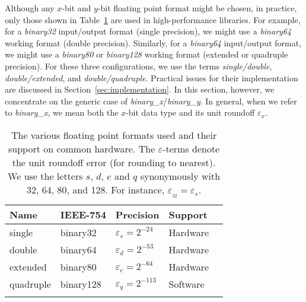 \documentclass[final]{siamltex}
\newcommand{\binaryx}{{\it binary\_\hspace*{1pt}x}}
\newcommand{\binaryy}{{\it binary\_\hspace*{0pt}y}}
\begin{document}
Although any $x$-bit and $y$-bit floating point format might be chosen, in
practice, only those shown in
Table~\ref{tab:precisions} are used in high-performance libraries. 
For example, for a {\it binary32} input/output format (single precision), we
might use a {\it binary64} working format (double precision). Similarly, for
a {\it binary64} input/output format, we might use a {\it binary80} or {\it binary128} working
format (extended or quadruple precision). For these three configurations, we use the terms
{\it single/double}, {\it double/extended}, and {\it
  double/quadruple}. Practical issues for their implementation are  
discussed in Section~\ref{sec:implementation}. In this section, however, we
concentrate on the generic case of \binaryx/\binaryy. In general, when we
refer to \binaryx, we mean both the $x$-bit data type and its unit roundoff $\varepsilon_x$. 
\begin{table}[htb]
  \begin{center}
\begin{tabular}[thb]{l@{\quad}l@{\quad}l@{\quad}l@{\quad}l@{\quad}}
\toprule
{\bf Name} & {\bf IEEE-754} & {\bf Precision} & {\bf Support}  \\
\midrule
single    & binary32   & $\varepsilon_s = 2^{-24}$ &  Hardware       \\ 
double    & binary64   & $\varepsilon_d = 2^{-53}$ &  Hardware       \\ 
extended  & binary80   & $\varepsilon_e = 2^{-64}$ &  Hardware       \\ 
quadruple & binary128  & $\varepsilon_q = 2^{-113}$ & Software       \\ 
\bottomrule\noalign{\smallskip}
\end{tabular}
  \end{center}
  \caption{The various floating point formats used and their support on common
    hardware. The $\varepsilon$-terms denote the unit roundoff error (for 
    rounding to nearest). We use the letters $s$, $d$, $e$ and
    $q$ synonymously with 32, 64, 80, and 128. For instance,
    $\varepsilon_{_{32}} = \varepsilon_s$.}
  \label{tab:precisions}
\end{table}
\end{document}
